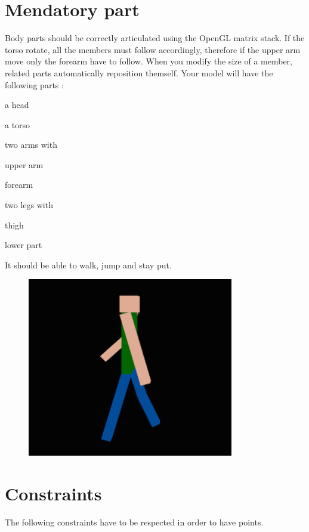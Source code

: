 \documentclass{42-en}
\newenvironment{ft_itemize}
{ \begin{itemize}
	\setlength{\itemsep}{0pt}
	\setlength{\parskip}{0pt}
	\setlength{\parsep}{0pt}     }
{ \end{itemize}                  }
\begin{document}
		\section{Mendatory part}
		Body parts should be correctly articulated using the OpenGL matrix stack. If the torso rotate, all the members must follow accordingly, therefore if the upper arm move only the forearm have to follow. When you modify the size of a member, related parts automatically reposition themself.\newline
		Your model will have the following parts :
		\begin{ft_itemize}
			\item a head
			\item a torso
			\item two arms with
			\begin{ft_itemize}
				\item upper arm
				\item forearm
			\end{ft_itemize}
			\item two legs with
			\begin{ft_itemize}
				\item thigh
				\item lower part
			\end{ft_itemize}
		\end{ft_itemize}
		{
			\noindent
			It should be able to walk, jump and stay put.
		}
		\begin{figure}[ht!]
			\centering
				\includegraphics[width=90mm]{images/humangl-walking.png}
		\end{figure}
\newpage
	\section{Constraints}
		The following constraints have to be respected in order to have points.
\end{document}
